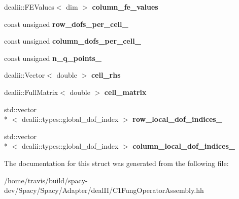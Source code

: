 \begin{DoxyCompactItemize}
\item 
\hypertarget{structSpacy_1_1dealII_1_1Detail_1_1LocalAssemblyBase_aaf9d2501f535b337e2d374b41275d5ae}{dealii\-::\-F\-E\-Values$<$ dim $>$ {\bfseries column\-\_\-fe\-\_\-values}}\label{structSpacy_1_1dealII_1_1Detail_1_1LocalAssemblyBase_aaf9d2501f535b337e2d374b41275d5ae}

\item 
\hypertarget{structSpacy_1_1dealII_1_1Detail_1_1LocalAssemblyBase_a996b6952c0fc08aa7f2817c7a4f2b313}{const unsigned {\bfseries row\-\_\-dofs\-\_\-per\-\_\-cell\-\_\-}}\label{structSpacy_1_1dealII_1_1Detail_1_1LocalAssemblyBase_a996b6952c0fc08aa7f2817c7a4f2b313}

\item 
\hypertarget{structSpacy_1_1dealII_1_1Detail_1_1LocalAssemblyBase_a09cc798555d81b9343a4cfd352b4789f}{const unsigned {\bfseries column\-\_\-dofs\-\_\-per\-\_\-cell\-\_\-}}\label{structSpacy_1_1dealII_1_1Detail_1_1LocalAssemblyBase_a09cc798555d81b9343a4cfd352b4789f}

\item 
\hypertarget{structSpacy_1_1dealII_1_1Detail_1_1LocalAssemblyBase_a009993ec7e3c5e38ca44f2dbd160a280}{const unsigned {\bfseries n\-\_\-q\-\_\-points\-\_\-}}\label{structSpacy_1_1dealII_1_1Detail_1_1LocalAssemblyBase_a009993ec7e3c5e38ca44f2dbd160a280}

\item 
\hypertarget{structSpacy_1_1dealII_1_1Detail_1_1LocalAssemblyBase_a407f1e4a2f7d293a61dd295be569d0d2}{dealii\-::\-Vector$<$ double $>$ {\bfseries cell\-\_\-rhs}}\label{structSpacy_1_1dealII_1_1Detail_1_1LocalAssemblyBase_a407f1e4a2f7d293a61dd295be569d0d2}

\item 
\hypertarget{structSpacy_1_1dealII_1_1Detail_1_1LocalAssemblyBase_a4c9f8591abb90e2af136b0c82c3fd973}{dealii\-::\-Full\-Matrix$<$ double $>$ {\bfseries cell\-\_\-matrix}}\label{structSpacy_1_1dealII_1_1Detail_1_1LocalAssemblyBase_a4c9f8591abb90e2af136b0c82c3fd973}

\item 
\hypertarget{structSpacy_1_1dealII_1_1Detail_1_1LocalAssemblyBase_a07f3065dbebecd404259ed7a374544a5}{std\-::vector\\*
$<$ dealii\-::types\-::global\-\_\-dof\-\_\-index $>$ {\bfseries row\-\_\-local\-\_\-dof\-\_\-indices\-\_\-}}\label{structSpacy_1_1dealII_1_1Detail_1_1LocalAssemblyBase_a07f3065dbebecd404259ed7a374544a5}

\item 
\hypertarget{structSpacy_1_1dealII_1_1Detail_1_1LocalAssemblyBase_aa9aee3575f199c88d3414b4f7e53cb26}{std\-::vector\\*
$<$ dealii\-::types\-::global\-\_\-dof\-\_\-index $>$ {\bfseries column\-\_\-local\-\_\-dof\-\_\-indices\-\_\-}}\label{structSpacy_1_1dealII_1_1Detail_1_1LocalAssemblyBase_aa9aee3575f199c88d3414b4f7e53cb26}

\end{DoxyCompactItemize}


The documentation for this struct was generated from the following file\-:\begin{DoxyCompactItemize}
\item 
/home/travis/build/spacy-\/dev/\-Spacy/\-Spacy/\-Adapter/deal\-I\-I/C1\-Fung\-Operator\-Assembly.\-hh\end{DoxyCompactItemize}
